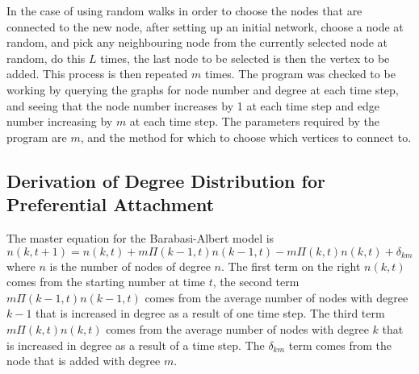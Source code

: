 \documentclass[twoside]{article}
\begin{document}
In the case of using random walks in order to choose the nodes that are connected to the new node, after setting up an initial network, choose a node at random, and pick any neighbouring node from the currently selected node at random, do this $L$ times, the last node to be selected is then the vertex to be added. This process is then repeated $m$ times. The program was checked to be working by querying the graphs for node number and degree at each time step, and seeing that the node number increases by 1 at each time step and edge number increasing by $m$ at each time step. The parameters required by the program are $m$, and the method for which to choose which vertices to connect to.

\subsection{Derivation of Degree Distribution for Preferential Attachment}
The master equation for the Barabasi-Albert model is
\[
n(k,t+1) = n(k,t) +m\Pi (k-1,t) n(k-1 , t) - m \Pi (k,t) n (k,t) +\delta_{km}
\]
where $n$ is the number of nodes of degree $n$. The first term on the right $n(k,t)$ comes from the starting number at time $t$, the second term $m\Pi (k-1,t) n(k-1 , t)$ comes from the average number of nodes with degree $k-1$ that is increased in degree as a result of one time step. The third term $m \Pi (k,t) n (k,t)$ comes from the average number of nodes with degree $k$ that is increased in degree as a result of a time step. The $\delta_{km}$ term comes from the node that is added with degree $m$. 
\end{document}
